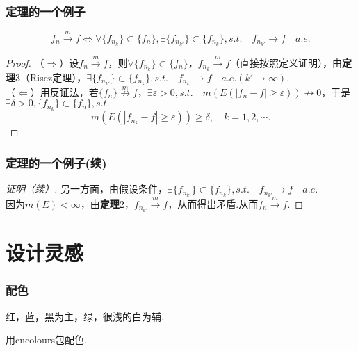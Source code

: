 \documentclass{beamer}
\begin{document}
\begin{frame}
    \frametitle{定理的一个例子}
    \begin{theorem}[Risez定理的一个应用]
    \begin{equation*}
        f_n \stackrel{m}{\longrightarrow} f \Leftrightarrow \forall \{f_{n_k}\} \subset \{f_n\}, \exists \{f_{n_{k'}}\} \subset \{f_{n_k}\}, s.t. \quad f_{n_{k'}} \to f \quad a.e.     
    \end{equation*}
    \end{theorem}
    \renewcommand{\qedsymbol}{}
    \begin{proof}
        （$\Rightarrow$）设$f_n \stackrel{m}{\longrightarrow}f$，则$\forall \{f_{n_k}\} \subset \{f_n\}$，$f_{n_k} \stackrel{m}{\longrightarrow} f$（直接按照定义证明），由\textbf{定理$3$}（Risez定理），$\exists \{f_{n_{k'}}\} \subset \{f_{n_k}\}, s.t. \quad f_{n_{k'}} \to f \quad a.e. (k' \to \infty).$ \\
        （$\Leftarrow$）用反证法，若$\{f_n\} \stackrel{m}{\nrightarrow} f$，$\exists \varepsilon > 0, s.t. \quad m(E(|f_n - f| \geqslant \varepsilon)) \nrightarrow 0$，于是$\exists \delta > 0, \{f_{n_k}\} \subset \{f_n\}, s.t.$ \[m(E(|f_{n_k} - f| \geqslant \varepsilon)) \geqslant \delta, \quad k = 1, 2, \cdots.\] 
    \end{proof}
\end{frame}

\begin{frame}
    \frametitle{定理的一个例子(续)}
    \begin{proof}[证明（续）]
        另一方面，由假设条件，$\exists \{f_{n_{k'}}\} \subset \{f_{n_k}\}, s.t. \quad f_{n_{k'}} \to f \quad a.e.$ \\
        因为$m(E) < \infty$，由\textbf{定理$2$}，$f_{n_{k'}} \stackrel{m}{\longrightarrow} f$，从而得出矛盾.从而$f_n \stackrel{m}{\longrightarrow} f$.
    \end{proof}
\end{frame}

\section{设计灵感}
\begin{frame}
    \frametitle{配色}
    红，蓝，黑为主，绿，很浅的白为辅.

    用cncolours包配色.
\end{frame}
\end{document}
